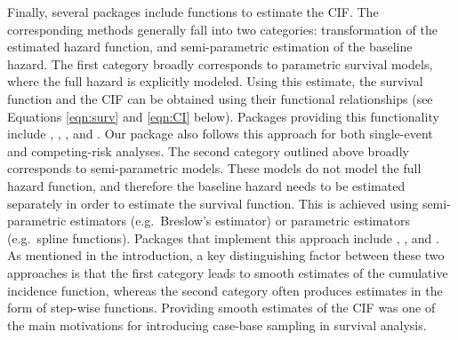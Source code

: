 \documentclass[
]{jss}
\begin{document}
Finally, several packages include functions to estimate the CIF. The
corresponding methods generally fall into two categories: transformation
of the estimated hazard function, and semi-parametric estimation of the
baseline hazard. The first category broadly corresponds to parametric
survival models, where the full hazard is explicitly modeled. Using this
estimate, the survival function and the CIF can be obtained using their
functional relationships (see Equations \ref{eqn:surv} and \ref{eqn:CI}
below). Packages providing this functionality include ,
, , and . Our package
 also follows this approach for both single-event and
competing-risk analyses. The second category outlined above broadly
corresponds to semi-parametric models. These models do not model the
full hazard function, and therefore the baseline hazard needs to be
estimated separately in order to estimate the survival function. This is
achieved using semi-parametric estimators (e.g.~Breslow's estimator) or
parametric estimators (e.g.~spline functions). Packages that implement
this approach include , , and
. As mentioned in the introduction, a key distinguishing
factor between these two approaches is that the first category leads to
smooth estimates of the cumulative incidence function, whereas the
second category often produces estimates in the form of step-wise
functions. Providing smooth estimates of the CIF was one of the main
motivations for introducing case-base sampling in survival analysis.
\end{document}
